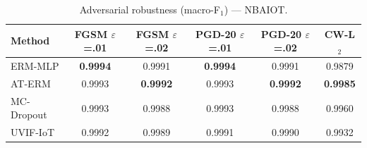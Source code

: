\begin{table}[t]
\caption{Adversarial robustness (macro-F$_1$) — NBAIOT.}
\label{tab:adv_nbaiot}
\centering
\begin{tabular}{lccccc}
\toprule
Method & FGSM $\varepsilon$=.01 & FGSM $\varepsilon$=.02 & PGD-20 $\varepsilon$=.01 & PGD-20 $\varepsilon$=.02 & CW-L$_2$ \\
\midrule
ERM-MLP & \textbf{0.9994} & 0.9991 & \textbf{0.9994} & 0.9991 & 0.9879 \\
AT-ERM & 0.9993 & \textbf{0.9992} & 0.9993 & \textbf{0.9992} & \textbf{0.9985} \\
MC-Dropout & 0.9993 & 0.9988 & 0.9993 & 0.9988 & 0.9960 \\
UVIF-IoT & 0.9992 & 0.9989 & 0.9991 & 0.9990 & 0.9932 \\
\bottomrule
\end{tabular}
\end{table}